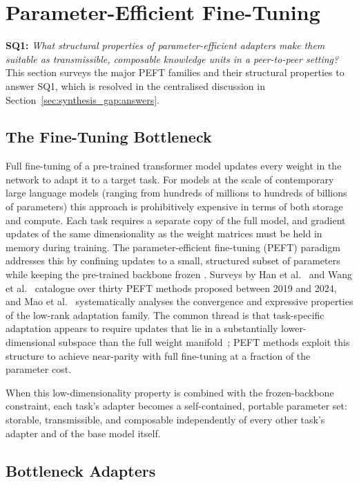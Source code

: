 \section{Parameter-Efficient Fine-Tuning}
\label{sec:peft}

\noindent\textbf{SQ1:} \textit{What structural properties of
parameter-efficient adapters make them suitable as transmissible, composable
knowledge units in a peer-to-peer setting?} This section surveys the major
PEFT families and their structural properties to answer SQ1, which is resolved
in the centralised discussion in Section~\ref{sec:synthesis_gap:answers}.

\subsection{The Fine-Tuning Bottleneck}
\label{sec:peft:intro}

Full fine-tuning of a pre-trained transformer model updates every weight in the network
to adapt it to a target task. For models at the scale of contemporary large language models (ranging from hundreds of millions to hundreds of billions of parameters)
this approach is prohibitively expensive in terms of both storage and compute. Each
task requires a separate copy of the full model, and gradient updates of the same
dimensionality as the weight matrices must be held in memory during training. The
parameter-efficient fine-tuning (PEFT) paradigm addresses this by confining updates to a
small, structured subset of parameters while keeping the pre-trained backbone frozen
\cite{DingNature2023}. Surveys by Han et al.~\cite{Han2024} and Wang et al.~\cite{WangAIReview2024}
catalogue over thirty PEFT methods proposed between 2019 and 2024, and Mao et al.~\cite{MaoLoraSurvey2024}
systematically analyses the convergence and expressive properties of the low-rank
adaptation family.
The common thread is that task-specific adaptation appears to require updates that lie
in a substantially lower-dimensional
subspace than the full weight manifold~\cite{Aghajanyan2021Intrinsic}; PEFT methods exploit this structure to achieve
near-parity with full fine-tuning at a fraction of the parameter cost.

When this low-dimensionality property is combined with the frozen-backbone constraint,
each task's adapter becomes a self-contained, portable parameter set: storable, transmissible,
and composable independently of every other task's adapter and of the base model itself.

\subsection{Bottleneck Adapters}
\label{sec:peft:bottleneck}

